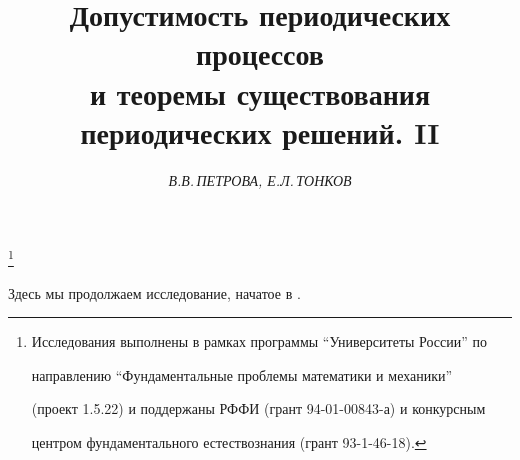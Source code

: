  


 




 


\setcounter{page}{17} 












\author{\it В.В.\,ПЕТРОВА, Е.Л.\,ТОНКОВ} 


\title{Допустимость периодических процессов\\


и теоремы существования периодических решений. II}


 


\thanks{Исследования выполнены в рамках программы ``Университеты России'' по


направлению ``Фундаментальные проблемы математики и механики''


(проект 1.5.22) и поддержаны РФФИ (грант 94-01-00843-а) и конкурсным


центром фундаментального естествознания (грант 93-1-46-18).}


\date{} 




 


\pagestyle{plain} %


 


 




 


\maketitle 


 




 


Здесь мы продолжаем исследование, начатое в \cite{Pet1}.





